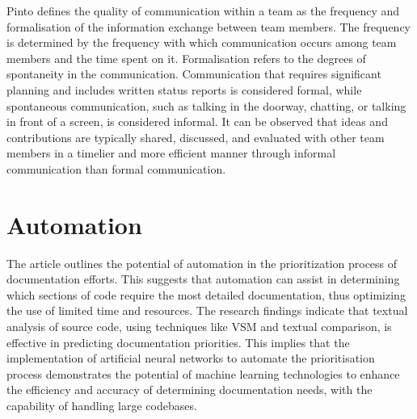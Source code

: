 Pinto \cite{Pinto1990} defines the quality of communication within a team as the frequency and formalisation of the information exchange between team members. The frequency is determined by the frequency with which communication occurs among team members and the time spent on it. Formalisation refers to the degrees of spontaneity in the communication. Communication that requires significant planning and includes written status reports is considered formal, while spontaneous communication, such as talking in the doorway, chatting, or talking in front of a screen, is considered informal. It can be observed that ideas and contributions are typically shared, discussed, and evaluated with other team members in a timelier and more efficient manner through informal communication than formal communication. 


\section{Automation}

The article \cite{McBurney2017PrioritizingDocEffort} outlines the potential of automation in the prioritization process of documentation efforts. This suggests that automation can assist in determining which sections of code require the most detailed documentation, thus optimizing the use of limited time and resources. The research findings indicate that textual analysis of source code, using techniques like \ac{VSM} and textual comparison, is effective in predicting documentation priorities. This implies that the implementation of artificial neural networks to automate the prioritisation process demonstrates the potential of machine learning technologies to enhance the efficiency and accuracy of determining documentation needs, with the capability of handling large codebases.


